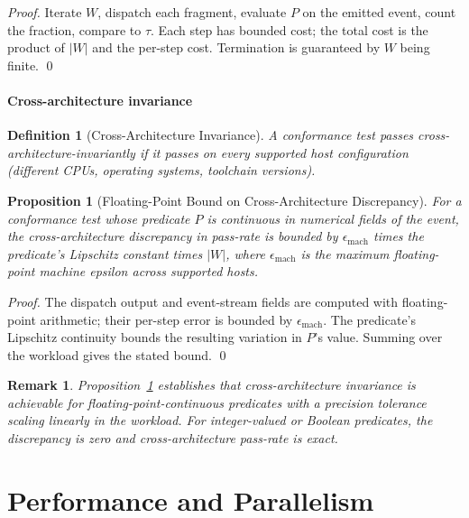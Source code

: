 \documentclass[twocolumn,11pt,a4paper]{article}
\newtheorem{proposition}[theorem]{Proposition}
\newtheorem{definition}[theorem]{Definition}
\newtheorem{remark}[theorem]{Remark}
\begin{document}
\begin{proof}
Iterate $W$, dispatch each fragment, evaluate $P$ on the emitted event, count the fraction, compare to $\tau$. Each step has bounded cost; the total cost is the product of $|W|$ and the per-step cost. Termination is guaranteed by $W$ being finite. \qed
\end{proof}

\subsection{Cross-architecture invariance}

\begin{definition}[Cross-Architecture Invariance]
\label{def:cross-arch}
A conformance test passes \emph{cross-architecture-invariantly} if it passes on every supported host configuration (different CPUs, operating systems, toolchain versions).
\end{definition}

\begin{proposition}[Floating-Point Bound on Cross-Architecture Discrepancy]
\label{prop:fp-bound}
For a conformance test whose predicate $P$ is continuous in numerical fields of the event, the cross-architecture discrepancy in pass-rate is bounded by $\epsilon_{\mathrm{mach}}$ times the predicate's Lipschitz constant times $|W|$, where $\epsilon_{\mathrm{mach}}$ is the maximum floating-point machine epsilon across supported hosts.
\end{proposition}

\begin{proof}
The dispatch output and event-stream fields are computed with floating-point arithmetic; their per-step error is bounded by $\epsilon_{\mathrm{mach}}$. The predicate's Lipschitz continuity bounds the resulting variation in $P$'s value. Summing over the workload gives the stated bound. \qed
\end{proof}

\begin{remark}
Proposition~\ref{prop:fp-bound} establishes that cross-architecture invariance is achievable for floating-point-continuous predicates with a precision tolerance scaling linearly in the workload. For integer-valued or Boolean predicates, the discrepancy is zero and cross-architecture pass-rate is exact.
\end{remark}

\part{Performance and Parallelism}
\end{document}
